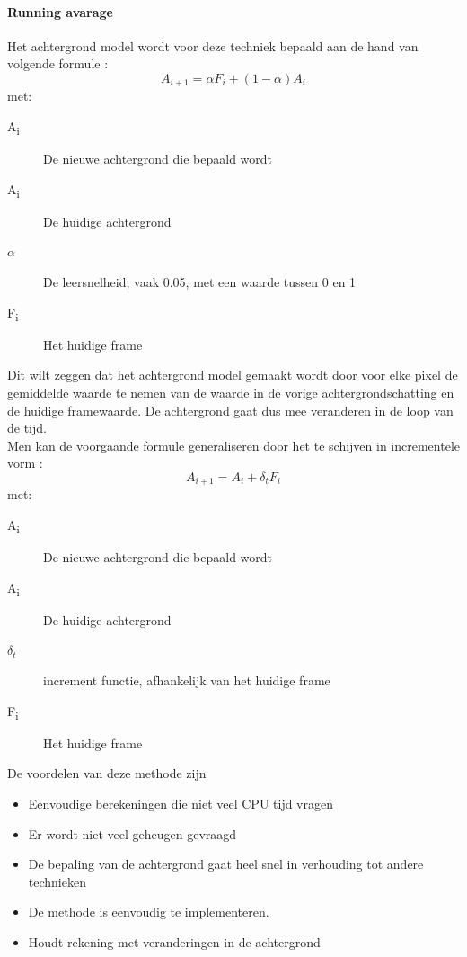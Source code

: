 \paragraph{Running avarage}
\label{refRUA}
Het achtergrond model wordt voor deze techniek bepaald aan de hand van volgende formule \cite{bibBEt}:
\begin{displaymath}
A_{i+1}=\alpha F_i+(1-\alpha)A_i
\end{displaymath}
met:
\begin{description}
	\item[A\textsubscript{i}] De nieuwe achtergrond die bepaald wordt
	\item[A\textsubscript{i}] De huidige achtergrond
	\item[$\alpha$] De leersnelheid, vaak 0.05, met een waarde tussen 0 en 1
	\item[F\textsubscript{i}] Het huidige frame
\end{description}
Dit wilt zeggen dat het achtergrond model gemaakt wordt door voor elke pixel de gemiddelde waarde te nemen van de waarde in de vorige achtergrondschatting en de huidige framewaarde. De achtergrond gaat dus mee veranderen in de loop van de tijd. \\
Men kan de voorgaande formule generaliseren door het te schijven in incrementele vorm \cite{bibSDB}:
\begin{displaymath}
A_{i+1}=A_i+\delta_t F_i
\end{displaymath}
met:
\begin{description}
	\item[A\textsubscript{i}] De nieuwe achtergrond die bepaald wordt	
	\item[A\textsubscript{i}] De huidige achtergrond
	\item[$\delta_t$] increment functie, afhankelijk van het huidige frame
	\item[F\textsubscript{i}] Het huidige frame
\end{description}
De voordelen van deze methode zijn
\begin{itemize}
	\item Eenvoudige berekeningen die niet veel CPU tijd vragen
	\item Er wordt niet veel geheugen gevraagd
	\item De bepaling van de achtergrond gaat heel snel in verhouding tot andere technieken
	\item De methode is eenvoudig te implementeren.
	\item Houdt rekening met veranderingen in de achtergrond
\end{itemize}
